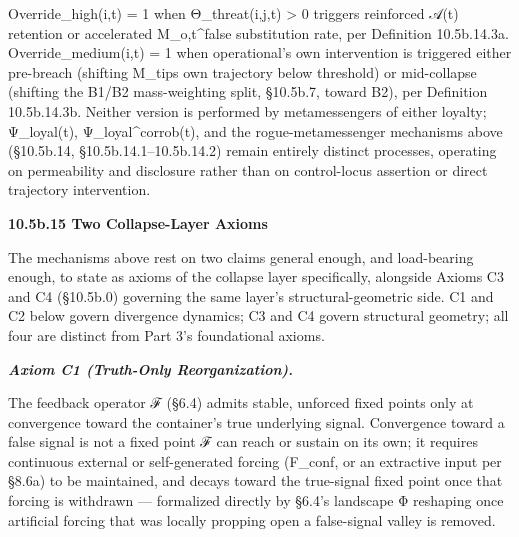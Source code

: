 \documentclass[
]{article}
\begin{document}
Override\_high(i,t) = 1 when Θ\_threat(i,j,t) \textgreater{} 0 triggers
reinforced 𝒜(t) retention or accelerated M\_o,t\^{}false substitution
rate, per Definition 10.5b.14.3a. Override\_medium(i,t) = 1 when
operational's own intervention is triggered either pre-breach (shifting
M\_tips own trajectory below threshold) or mid-collapse (shifting the
B1/B2 mass-weighting split, §10.5b.7, toward B2), per Definition
10.5b.14.3b. Neither version is performed by metamessengers of either
loyalty; Ψ\_loyal(t), Ψ\_loyal\^{}corrob(t), and the rogue-metamessenger
mechanisms above (§10.5b.14, §10.5b.14.1--10.5b.14.2) remain entirely
distinct processes, operating on permeability and disclosure rather than
on control-locus assertion or direct trajectory intervention.

\textbf{10.5b.15 Two Collapse-Layer Axioms}

The mechanisms above rest on two claims general enough, and load-bearing
enough, to state as axioms of the collapse layer specifically, alongside
Axioms C3 and C4 (§10.5b.0) governing the same layer's
structural-geometric side. C1 and C2 below govern divergence dynamics;
C3 and C4 govern structural geometry; all four are distinct from Part
3's foundational axioms.

\emph{\textbf{Axiom C1 (Truth-Only Reorganization).}}

The feedback operator ℱ (§6.4) admits stable, unforced fixed points only
at convergence toward the container's true underlying signal.
Convergence toward a false signal is not a fixed point ℱ can reach or
sustain on its own; it requires continuous external or self-generated
forcing (F\_conf, or an extractive input per §8.6a) to be maintained,
and decays toward the true-signal fixed point once that forcing is
withdrawn --- formalized directly by §6.4's landscape Φ reshaping once
artificial forcing that was locally propping open a false-signal valley
is removed.
\end{document}
